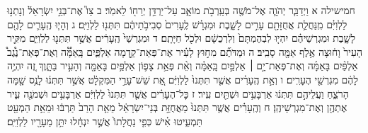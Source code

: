 \documentclass[twoside, openany, parskip=half, 11pt]{book}
\begin{document}
חמישילה א וַיְדַבֵּ֧ר יְהֹוָ֛ה אֶל־מֹשֶׁ֖ה בְּעַֽרְבֹ֣ת מוֹאָ֑ב עַל־יַרְדֵּ֥ן יְרֵח֖וֹ לֵאמֹֽר׃ ב צַו֮ אֶת־בְּנֵ֣י יִשְׂרָאֵל֒ וְנָתְנ֣וּ לַלְוִיִּ֗ם מִֽנַּחֲלַ֛ת אֲחֻזָּתָ֖ם עָרִ֣ים לָשָׁ֑בֶת וּמִגְרָ֗שׁ לֶֽעָרִים֙ סְבִיבֹ֣תֵיהֶ֔ם תִּתְּנ֖וּ לַלְוִיִּֽם׃ ג וְהָי֧וּ הֶֽעָרִ֛ים לָהֶ֖ם לָשָׁ֑בֶת וּמִגְרְשֵׁיהֶ֗ם יִהְי֤וּ לִבְהֶמְתָּם֙ וְלִרְכֻשָׁ֔ם וּלְכֹ֖ל חַיָּתָֽם׃ ד וּמִגְרְשֵׁי֙ הֶֽעָרִ֔ים אֲשֶׁ֥ר תִּתְּנ֖וּ לַלְוִיִּ֑ם מִקִּ֤יר הָעִיר֙ וָח֔וּצָה אֶ֥לֶף אַמָּ֖ה סָבִֽיב׃ ה וּמַדֹּתֶ֞ם מִח֣וּץ לָעִ֗יר אֶת־פְּאַת־קֵ֣דְמָה אַלְפַּ֪יִם בָּֽאַמָּ֟ה וְאֶת־פְּאַת־נֶ֩גֶב֩ אַלְפַּ֨יִם בָּאַמָּ֜ה וְאֶת־פְּאַת־יָ֣ם ׀ אַלְפַּ֣יִם בָּֽאַמָּ֗ה וְאֵ֨ת פְּאַ֥ת צָפ֛וֹן אַלְפַּ֥יִם בָּאַמָּ֖ה וְהָעִ֣יר בַּתָּ֑וֶךְ זֶ֚ה יִהְיֶ֣ה לָהֶ֔ם מִגְרְשֵׁ֖י הֶעָרִֽים׃ ו וְאֵ֣ת הֶֽעָרִ֗ים אֲשֶׁ֤ר תִּתְּנוּ֙ לַלְוִיִּ֔ם אֵ֚ת שֵׁשׁ־עָרֵ֣י הַמִּקְלָ֔ט אֲשֶׁ֣ר תִּתְּנ֔וּ לָנֻ֥ס שָׁ֖מָּה הָרֹצֵ֑חַ וַעֲלֵיהֶ֣ם תִּתְּנ֔וּ אַרְבָּעִ֥ים וּשְׁתַּ֖יִם עִֽיר׃ ז כׇּל־הֶעָרִ֗ים אֲשֶׁ֤ר תִּתְּנוּ֙ לַלְוִיִּ֔ם אַרְבָּעִ֥ים וּשְׁמֹנֶ֖ה עִ֑יר אֶתְהֶ֖ן וְאֶת־מִגְרְשֵׁיהֶֽן׃ ח וְהֶֽעָרִ֗ים אֲשֶׁ֤ר תִּתְּנוּ֙ מֵאֲחֻזַּ֣ת בְּנֵי־יִשְׂרָאֵ֔ל מֵאֵ֤ת הָרַב֙ תַּרְבּ֔וּ וּמֵאֵ֥ת הַמְעַ֖ט תַּמְעִ֑יטוּ אִ֗ישׁ כְּפִ֤י נַחֲלָתוֹ֙ אֲשֶׁ֣ר יִנְחָ֔לוּ יִתֵּ֥ן מֵעָרָ֖יו לַלְוִיִּֽם׃
\end{document}

